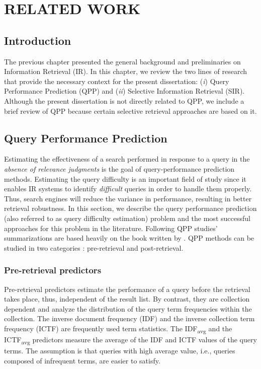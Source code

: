 


\chapter{\textbf{RELATED WORK}}
\label{ch3}

\section{Introduction}
The previous chapter presented the general background and preliminaries on Information Retrieval (IR).
In this chapter, we review the two lines of research that provide the necessary context for the present dissertation: (\emph{i}) Query Performance Prediction (QPP) and (\emph{ii}) Selective Information Retrieval (SIR).
Although the present dissertation is not directly related to QPP, we include a brief review of QPP because certain selective retrieval approaches are based on it.

\section{Query Performance Prediction}

Estimating the effectiveness of a search performed in response to a query in the \emph{absence of relevance judgments} is the goal of query-performance prediction methods.
Estimating the query difficulty is an important field of study since it enables IR systems to identify \emph{difficult} queries in order to handle them properly. 
Thus, search engines will reduce the variance in performance, resulting in better retrieval robustness.
In this section, we describe the query performance prediction (also referred to as query difficulty estimation) problem and the most successful approaches for this problem in the literature.
Following QPP studies' summarizations are based heavily on the book written by \citet*{carmel2010estimating}. 
QPP methods can be studied in two categories : pre-retrieval and post-retrieval.

\subsection{Pre-retrieval predictors} 
Pre-retrieval predictors estimate the performance of a query before the retrieval takes place, thus, independent of the result list.
By contrast, they are collection dependent and analyze the distribution of the query term frequencies within the collection.
The inverse document frequency (IDF) and the inverse collection term frequency (ICTF) are frequently used term statistics.
The IDF\textsubscript{avg} and the ICTF\textsubscript{avg} predictors measure the average of the IDF and ICTF values of the query terms.
The assumption is that queries with high average value, i.e., queries composed of infrequent terms, are easier to satisfy. 

